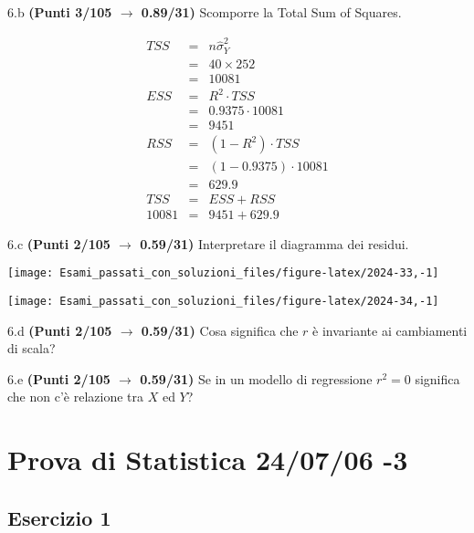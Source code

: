 \documentclass[
  11pt,
]{book}
\theoremstyle{mytheoremstyle}
\theoremstyle{mydefstyle}
\newenvironment{sol}
  {
  \begin{tcolorbox}[enhanced,breakable,arc=0.1mm,boxrule=1pt,colback=white,colframe=iblue,
  title=\bf \fontfamily{lmss}\selectfont \hspace{.5 cm} Soluzione,drop fuzzy shadow]

}{
\end{tcolorbox}
  }
\begin{document}
6.b \textbf{(Punti 3/105 \(\rightarrow\) 0.89/31)} Scomporre la Total Sum of Squares.

\begin{sol}
\begin{eqnarray*}
   TSS &=& n\hat\sigma^2_Y\\
      &=& 40 \times 252 \\
      &=&  10081 \\
   ESS &=& R^2\cdot TSS\\
      &=&  0.9375 \cdot 10081 \\
      &=& 9451 \\
   RSS &=& (1-R^2)\cdot TSS\\
      &=& (1- 0.9375 )\cdot 10081 \\
      &=&  629.9 \\
   TSS &=& ESS+RSS \\ 10081  &=&  9451 + 629.9 
  \end{eqnarray*}

\end{sol}

6.c \textbf{(Punti 2/105 \(\rightarrow\) 0.59/31)} Interpretare il diagramma dei residui.

\begin{center}\texttt{[image: Esami\_passati\_con\_soluzioni\_files/figure-latex/2024-33,-1]} \end{center}

\begin{sol}

\begin{center}\texttt{[image: Esami\_passati\_con\_soluzioni\_files/figure-latex/2024-34,-1]} \end{center}

\end{sol}

6.d \textbf{(Punti 2/105 \(\rightarrow\) 0.59/31)} Cosa significa che \(r\) è invariante ai cambiamenti di scala?

6.e \textbf{(Punti 2/105 \(\rightarrow\) 0.59/31)} Se in un modello di regressione \(r^2=0\) significa che non c'è relazione tra \(X\) ed \(Y\)?

\section{Prova di Statistica 24/07/06 -3}\label{prova-di-statistica-240706--3}

\subsection{Esercizio 1}\label{esercizio-1-43}
\end{document}
